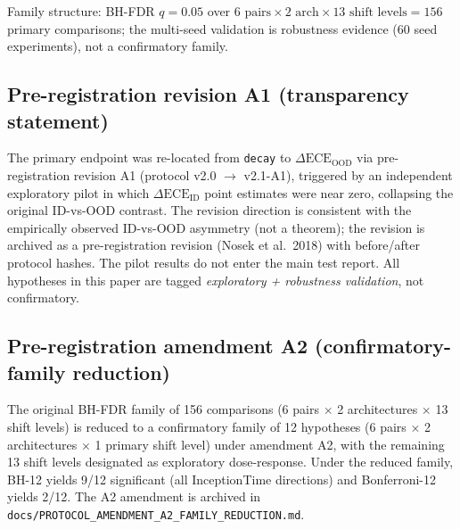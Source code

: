 \documentclass[review,12pt,nonatbib]{elsarticle}
\begin{document}
Family structure: BH-FDR $q=0.05$ over $6\text{ pairs}\times 2\text{ arch}\times 13\text{ shift levels}=156$
primary comparisons; the multi-seed validation is robustness evidence
(60 seed experiments), not a confirmatory family.

\subsection{Pre-registration revision A1 (transparency statement)}
The primary endpoint was re-located from \texttt{decay} to
$\Delta\text{ECE}_{\text{OOD}}$ via pre-registration revision A1
(protocol v2.0 $\rightarrow$ v2.1-A1), triggered by an independent
exploratory pilot in which $\Delta\text{ECE}_{\text{ID}}$ point
estimates were near zero, collapsing the original ID-vs-OOD contrast.
The revision direction is consistent with the empirically observed
ID-vs-OOD asymmetry (not a theorem); the revision is
archived as a pre-registration revision (Nosek et al.\ 2018) with
before/after protocol hashes. The pilot results do not enter the
main test report. All hypotheses in this paper are tagged
\emph{exploratory + robustness validation}, not confirmatory.

\subsection{Pre-registration amendment A2 (confirmatory-family reduction)}
\label{sec:a2}
The original
BH-FDR family of 156 comparisons (6 pairs $\times$ 2 architectures
$\times$ 13 shift levels) is reduced to a confirmatory family of 12
hypotheses (6 pairs $\times$ 2 architectures $\times$ 1 primary shift
level) under amendment A2, with the remaining 13 shift levels
designated as exploratory dose-response. Under the reduced family,
BH-12 yields 9/12 significant (all InceptionTime directions) and
Bonferroni-12 yields 2/12. The A2 amendment is archived in
\texttt{docs/PROTOCOL\_AMENDMENT\_A2\_}\allowbreak\texttt{FAMILY\_REDUCTION.md}.
\end{document}
